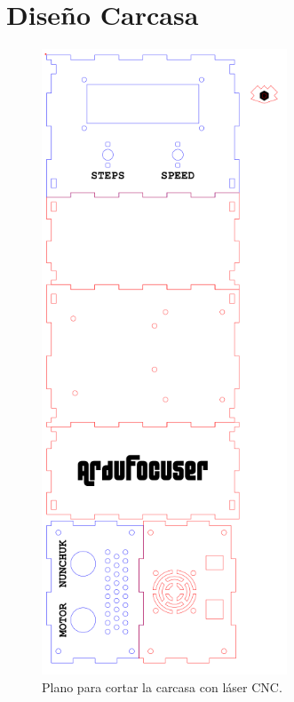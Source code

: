 \chapter{Diseño Carcasa}
\label{ap:caja}

\begin{figure}[h]
	\centering
	\includegraphics[width=0.65\textwidth]{../images/ardufocuser_Box_3mm}
	\caption[Plano para cortar la carcasa con láser CNC]{Plano para cortar la carcasa con láser CNC.}
	\label{fig:plano_carcasa}
\end{figure}



